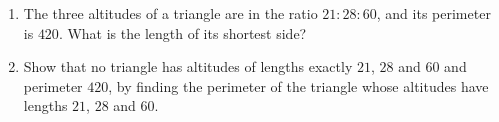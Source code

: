 \begin{enumerate}
\item[(a)] The three altitudes of a triangle are in the ratio $21:28:60$, and its perimeter is $420$. What is the length of its shortest side?
\item[(b)] Show that no triangle has altitudes of lengths exactly $21$, $28$ and $60$ and perimeter $420$, by finding the perimeter of the triangle whose altitudes have lengths $21$, $28$ and $60$.
\end{enumerate}
